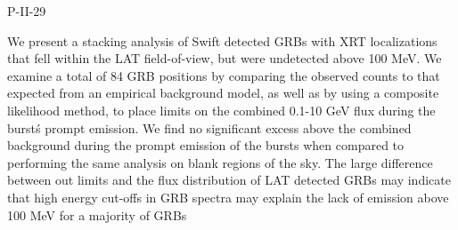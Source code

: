 P-II-29


\bigskip



\bigskip

\noindent We present a stacking analysis of Swift detected GRBs with XRT localizations that fell within the LAT field-of-view, but were undetected above 100 MeV. We examine a total of 84 GRB positions by comparing the observed counts to that expected from an empirical background model, as well as by using a composite likelihood method, to place limits on the combined  0.1-10 GeV flux during the burst\'s prompt emission. We find no significant excess above the combined background during the prompt emission of the bursts when compared to performing the same analysis on blank regions of the sky. The large difference between out limits and the flux distribution of LAT detected GRBs may indicate that high energy cut-offs in GRB spectra may explain the lack of emission above 100 MeV for a majority of GRBs
